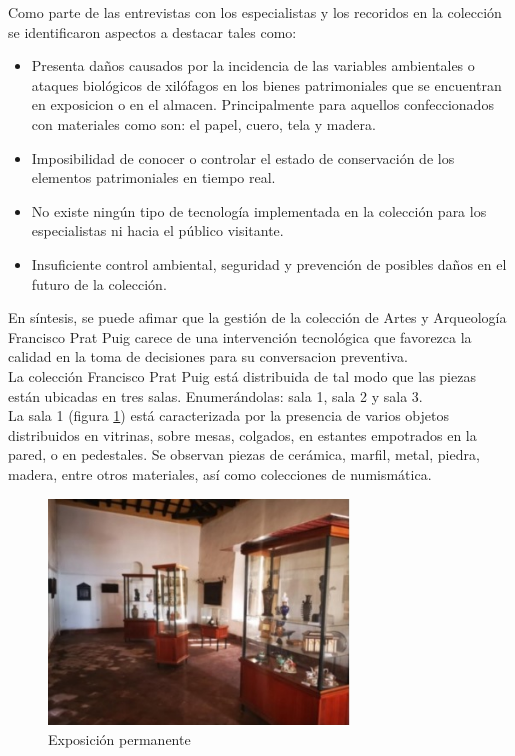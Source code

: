     Como parte de las entrevistas con los especialistas y los recoridos en la colección se identificaron aspectos a destacar tales como:

    \begin{itemize}
        \item Presenta daños causados por la incidencia de las variables ambientales o ataques biológicos de xilófagos en los bienes patrimoniales que se encuentran en exposicion o en el almacen. Principalmente para aquellos confeccionados con materiales como son: el papel, cuero, tela y madera.
        \item Imposibilidad de conocer o controlar el estado de conservación de los elementos patrimoniales en tiempo real.
        \item No existe ningún tipo de tecnología implementada en la colección para los especialistas ni hacia el público visitante.
        \item Insuficiente control ambiental, seguridad y prevención de posibles daños en el futuro de la colección.
    \end{itemize}

    En síntesis, se puede afimar que la gestión de la colección de Artes y Arqueología Francisco Prat Puig carece de una intervención tecnológica que favorezca la calidad en la toma de decisiones para su conversacion preventiva.\\

    La colección Francisco Prat Puig está distribuida de tal modo que las piezas están ubicadas en tres salas. Enumerándolas: sala 1, sala 2 y sala 3.\\
    La sala 1 (figura \ref{imag:sala_1}) está caracterizada por la presencia de varios objetos distribuidos en vitrinas, sobre mesas, colgados, en estantes empotrados en la pared, o en pedestales. Se observan piezas de cerámica, marfil, metal, piedra, madera, entre otros materiales, así como colecciones de numismática.\newline
    
    \begin{figure}[H]
        \centering
        \includegraphics[width=8cm, height=6cm]{imagenes/sala_1.jpg}
        \caption{Exposición permanente}
        \label{imag:sala_1}
    \end{figure}

